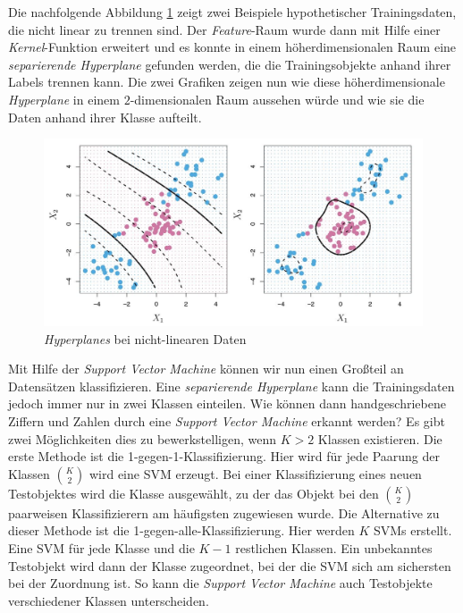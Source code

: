Die nachfolgende Abbildung \ref{fig:non_linear_data} zeigt zwei Beispiele hypothetischer Trainingsdaten, die nicht linear zu trennen sind.
Der \textit{Feature}-Raum wurde dann mit Hilfe einer \textit{Kernel}-Funktion erweitert und es konnte in einem höherdimensionalen Raum eine
\textit{separierende Hyperplane} gefunden werden, die die Trainingsobjekte anhand ihrer Labels trennen kann. 
Die zwei Grafiken zeigen nun wie diese höherdimensionale \textit{Hyperplane} in einem $2$-dimensionalen Raum aussehen würde 
und wie sie die Daten anhand ihrer Klasse aufteilt.
\begin{figure}[H]
	\centering
	\includegraphics[width=\imgMed]{images/theory/non_linear_data.jpg}
	\caption{\textit{Hyperplanes} bei nicht-linearen Daten \cite[S. 353]{james_2013}} 
	\label{fig:non_linear_data}
\end{figure}
Mit Hilfe der \textit{Support Vector Machine} können wir nun einen Großteil an Datensätzen klassifizieren. 
Eine \textit{separierende Hyperplane} kann die Trainingsdaten jedoch immer nur in zwei Klassen einteilen. 
Wie können dann handgeschriebene Ziffern und Zahlen durch eine \textit{Support Vector Machine} erkannt werden?
Es gibt zwei Möglichkeiten dies zu bewerkstelligen, wenn $K > 2$ Klassen existieren.
Die erste Methode ist die 1-gegen-1-Klassifizierung. Hier wird für jede Paarung der Klassen $K \choose 2$
wird eine SVM erzeugt. Bei einer Klassifizierung eines neuen Testobjektes wird die Klasse ausgewählt, zu der das Objekt bei den
$K \choose 2$ paarweisen Klassifizierern am häufigsten zugewiesen wurde.
Die Alternative zu dieser Methode ist die 1-gegen-alle-Klassifizierung. Hier werden $K$ SVMs erstellt.
Eine SVM für jede Klasse und die $K-1$ restlichen Klassen. Ein unbekanntes Testobjekt wird dann der Klasse zugeordnet,
bei der die SVM sich am sichersten bei der Zuordnung ist. 
So kann die \textit{Support Vector Machine} auch Testobjekte verschiedener Klassen unterscheiden.\cite[S. 355f.]{james_2013}\cite[S.1567]{noble_2006}

